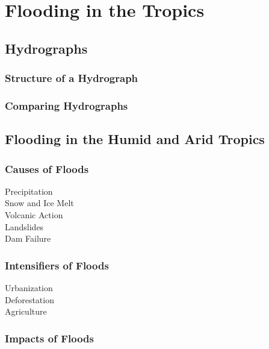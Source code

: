 \documentclass[../../main]{subfiles}
\begin{document}
\section{Flooding in the Tropics}

\subsection{Hydrographs}

\subsubsection{Structure of a Hydrograph}

\subsubsection{Comparing Hydrographs}

\subsection{Flooding in the Humid and Arid Tropics}

\subsubsection{Causes of Floods}

	\begin{description}
		\item[Precipitation]
		\item[Snow and Ice Melt]
		\item[Volcanic Action]
		\item[Landslides]
		\item[Dam Failure]
	\end{description}

\subsubsection{Intensifiers of Floods}

	\begin{description}
		\item[Urbanization]
		\item[Deforestation]
		\item[Agriculture]
	\end{description}

\subsubsection{Impacts of Floods}
\end{document}
